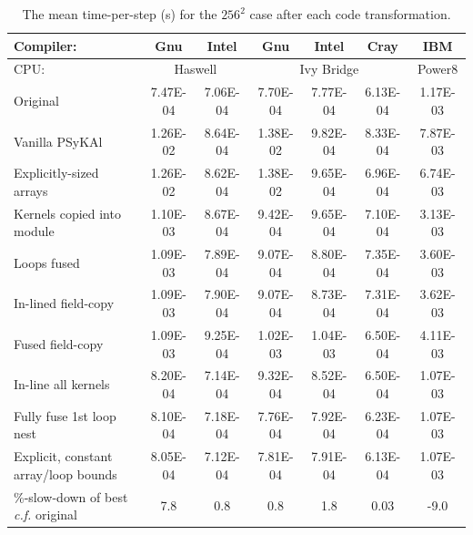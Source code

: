 \documentclass[journal]{IEEEtran}
\newcommand{\psykal}{{PS}y{KA}l\ }
\begin{document}
\begin{table}[!t]
\renewcommand{\arraystretch}{1.3}
\caption{The mean time-per-step (s) for the $256^2$ case after each 
code transformation.}
\label{TABLE_opt_breakdown}
\centering
\begin{tabular}{l|c|c|c|c|c|c}
\hline
Compiler:          &  Gnu  & Intel   & Gnu & Intel & Cray & IBM \\
\hline
CPU:               & \multicolumn{2}{c|}{Haswell} & \multicolumn{3}{c|}{Ivy Bridge} & Power8 \\
\hline
Original                               &  7.47E-04 & 7.06E-04 &	7.70E-04 & 7.77E-04 & 6.13E-04 &  1.17E-03  \\
Vanilla \psykal                        &  1.26E-02 & 8.64E-04 &	1.38E-02 & 9.82E-04 & 8.33E-04 &  7.87E-03  \\
Explicitly-sized arrays                &  1.26E-02 & 8.62E-04 &	1.38E-02 & 9.65E-04 & 6.96E-04 &  6.74E-03  \\
Kernels copied into module             &  1.10E-03 & 8.67E-04 &	9.42E-04 & 9.65E-04 & 7.10E-04 &  3.13E-03  \\
Loops fused                            &  1.09E-03 & 7.89E-04 &	9.07E-04 & 8.80E-04 & 7.35E-04 &  3.60E-03  \\
In-lined field-copy                    &  1.09E-03 & 7.90E-04 &	9.07E-04 & 8.73E-04 & 7.31E-04 &  3.62E-03  \\
Fused field-copy                       &  1.09E-03 & 9.25E-04 &	1.02E-03 & 1.04E-03 & 6.50E-04 &  4.11E-03  \\
In-line all kernels                    &  8.20E-04 & 7.14E-04 &	9.32E-04 & 8.52E-04 & 6.50E-04 &  1.07E-03  \\
Fully fuse 1st loop nest               &  8.10E-04 & 7.18E-04 &	7.76E-04 & 7.92E-04 & 6.23E-04 &  1.07E-03  \\
Explicit, constant array/loop bounds   &  8.05E-04 & 7.12E-04 &	7.81E-04 & 7.91E-04 & 6.13E-04 &  1.07E-03  \\
\hline
\parbox{2.5cm}{\%-slow-down of best {\it c.f.} original} & 7.8 & 0.8 & 0.8 & 1.8 & 0.03 & -9.0    \\
\hline
\end{tabular}
\end{table}
\end{document}

